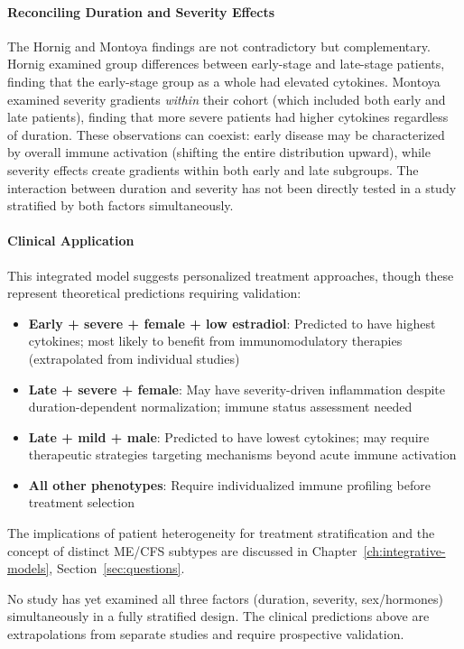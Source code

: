\paragraph{Reconciling Duration and Severity Effects}

The Hornig and Montoya findings are not contradictory but complementary. Hornig examined group differences between early-stage and late-stage patients, finding that the early-stage group as a whole had elevated cytokines. Montoya examined severity gradients \emph{within} their cohort (which included both early and late patients), finding that more severe patients had higher cytokines regardless of duration. These observations can coexist: early disease may be characterized by overall immune activation (shifting the entire distribution upward), while severity effects create gradients within both early and late subgroups. The interaction between duration and severity has not been directly tested in a study stratified by both factors simultaneously.

\paragraph{Clinical Application}

This integrated model suggests personalized treatment approaches, though these represent theoretical predictions requiring validation:
\begin{itemize}
    \item \textbf{Early + severe + female + low estradiol}: Predicted to have highest cytokines; most likely to benefit from immunomodulatory therapies (extrapolated from individual studies)
    \item \textbf{Late + severe + female}: May have severity-driven inflammation despite duration-dependent normalization; immune status assessment needed
    \item \textbf{Late + mild + male}: Predicted to have lowest cytokines; may require therapeutic strategies targeting mechanisms beyond acute immune activation
    \item \textbf{All other phenotypes}: Require individualized immune profiling before treatment selection
\end{itemize}

The implications of patient heterogeneity for treatment stratification and the concept of distinct ME/CFS subtypes are discussed in Chapter~\ref{ch:integrative-models}, Section~\ref{sec:questions}.

No study has yet examined all three factors (duration, severity, sex/hormones) simultaneously in a fully stratified design. The clinical predictions above are extrapolations from separate studies and require prospective validation.

